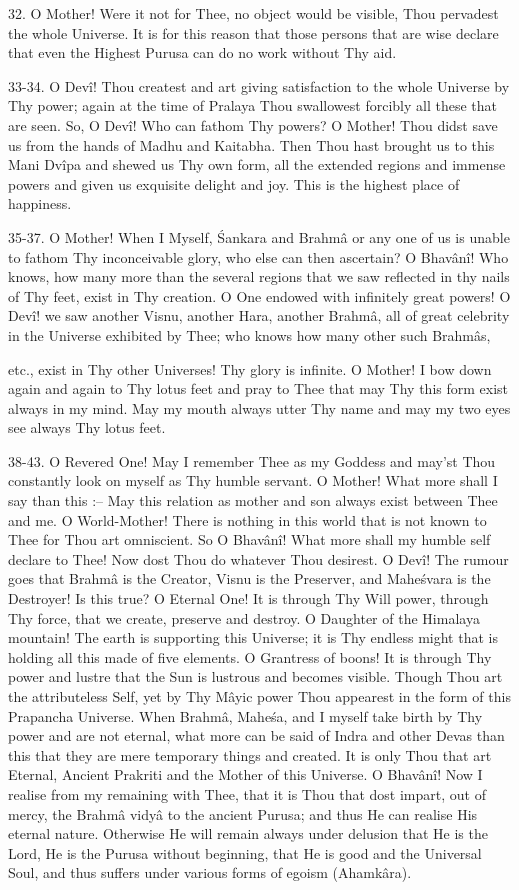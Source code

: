 32. O Mother! Were it not for Thee, no object would be visible, Thou pervadest the whole Universe. It is for this reason that those persons that are wise declare that even the Highest Purusa can do no work without Thy aid.

33-34. O Dev\^i! Thou createst and art giving satisfaction to the whole Universe by Thy power; again at the time of Pralaya Thou swallowest forcibly all these that are seen. So, O Dev\^i! Who can fathom Thy powers? O Mother! Thou didst save us from the hands of Madhu and Kaitabha. Then Thou hast brought us to this Mani Dv\^ipa and shewed us Thy own form, all the extended regions and immense powers and given us exquisite delight and joy. This is the highest place of happiness.

35-37. O Mother! When I Myself, \'Sankara and Brahm\^a or any one of us is unable to fathom Thy inconceivable glory, who else can then ascertain? O Bhav\^an\^i! Who knows, how many more than the several regions that we saw reflected in thy nails of Thy feet, exist in Thy creation. O One endowed with infinitely great powers! O Dev\^i! we saw another Visnu, another Hara, another Brahm\^a, all of great celebrity in the Universe exhibited by Thee; who knows how many other such Brahm\^as,

etc., exist in Thy other Universes! Thy glory is infinite. O Mother! I bow down again and again to Thy lotus feet and pray to Thee that may Thy this form exist always in my mind. May my mouth always utter Thy name and may my two eyes see always Thy lotus feet.

38-43. O Revered One! May I remember Thee as my Goddess and may'st Thou constantly look on myself as Thy humble servant. O Mother! What more shall I say than this :-- May this relation as mother and son always exist between Thee and me. O World-Mother! There is nothing in this world that is not known to Thee for Thou art omniscient. So O Bhav\^an\^i! What more shall my humble self declare to Thee! Now dost Thou do whatever Thou desirest. O Dev\^i! The rumour goes that Brahm\^a is the Creator, Visnu is the Preserver, and Mahe\'svara is the Destroyer! Is this true? O Eternal One! It is through Thy Will power, through Thy force, that we create, preserve and destroy. O Daughter of the Himalaya mountain! The earth is supporting this Universe; it is Thy endless might that is holding all this made of five elements. O Grantress of boons! It is through Thy power and lustre that the Sun is lustrous and becomes visible. Though Thou art the attributeless Self, yet by Thy M\^ayic power Thou appearest in the form of this Prapancha Universe. When Brahm\^a, Mahe\'sa, and I myself take birth by Thy power and are not eternal, what more can be said of Indra and other Devas than this that they are mere temporary things and created. It is only Thou that art Eternal, Ancient Prakriti and the Mother of this Universe. O Bhav\^an\^i! Now I realise from my remaining with Thee, that it is Thou that dost impart, out of mercy, the Brahm\^a vidy\^a to the ancient Purusa; and thus He can realise His eternal nature. Otherwise He will remain always under delusion that He is the Lord, He is the Purusa without beginning, that He is good and the Universal Soul, and thus suffers under various forms of egoism (Ahamk\^ara).


